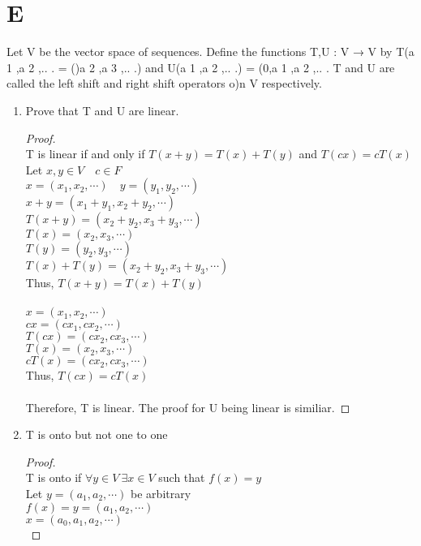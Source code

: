 \documentclass[11pt]{scrartcl}
\begin{document}
\section{E}
Let V be the vector space of sequences. Define the functions T,U : V → V by
T(a 1 ,a 2 ,.. . = ()a 2 ,a 3 ,.. .) and U(a 1 ,a 2 ,.. .) = (0,a 1 ,a 2 ,.. .
T and U are called the left shift and right shift operators o)n V respectively.
\begin{enumerate}[label=\alph*.]
	\item{
		Prove that T and U are linear.
		\begin{proof}
			\-\\
			T is linear if and only if $T(x+y) = T(x) + T(y)$ and $T(cx) = cT(x)$\\	
			Let $x,y \in V \quad c \in F$\\
			$x = (x_1, x_2, \cdots) \quad y = (y_1, y_2, \cdots)$\\
			$x + y = (x_1 + y_1, x_2 + y_2, \cdots)$ \\
			$T(x + y) = (x_2 + y_2, x_3 + y_3, \cdots)$ \\
			$T(x) = (x_2, x_3, \cdots)$\\
			$T(y) = (y_2, y_3, \cdots)$\\
			$T(x) + T(y) = (x_2 + y_2, x_3 + y_3, \cdots)$ \\
			Thus, $T(x + y) = T(x) + T(y)$\\
			\-\\
			$x = (x_1, x_2, \cdots)$\\
			$cx = (cx_1, cx_2, \cdots)$\\
			$T(cx) = (cx_2, cx_3, \cdots)$\\
			$T(x) = (x_2, x_3, \cdots)$\\
			$cT(x) = (cx_2, cx_3, \cdots)$\\
			Thus, $T(cx) = cT(x)$\\
			\-\\
			Therefore, T is linear. The proof for U being linear is similiar.
		\end{proof}
		}
		\item{
			T is onto but not one to one
			\begin{proof}
			\-\\
			T is onto if $\forall y \in V \ \exists x \in V$ such that $f(x)=y$\\
			Let $y = (a_1, a_2, \cdots)$ be arbitrary\\
			$f(x) = y = (a_1, a_2, \cdots)$\\
		 	$x = (a_0, a_1, a_2, \cdots)$\\

\end{proof}}
\end{enumerate}
\end{document}
